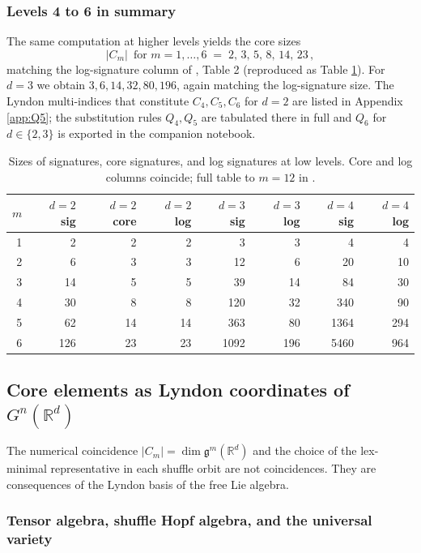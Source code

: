 \documentclass[12pt,english]{article}
\providecommand{\tabularnewline}{\\}
\theoremstyle{remark}
\begin{document}
\subsubsection{Levels 4 to 6 in summary}

The same computation at higher levels yields the core sizes
\begin{equation}
|C_{m}|\,\text{ for }m=1,\ldots,6\;=\;2,\,3,\,5,\,8,\,14,\,23\,,\label{eq:CoreSizesD2}
\end{equation}
matching the log-signature column of \cite{log signatures}, Table
2 (reproduced as Table \ref{tab:Sizes-log-sign}). For $d=3$ we obtain
$3,6,14,32,80,196$, again matching the log-signature size. The Lyndon
multi-indices that constitute $C_{4},C_{5},C_{6}$ for $d=2$ are
listed in Appendix \ref{app:Q5}; the substitution rules $Q_{4},Q_{5}$
are tabulated there in full and $Q_{6}$ for $d\in\{2,3\}$ is exported
in the companion notebook.

\begin{table}[H]
\centering
\begin{tabular}{|r|r|r|r|r|r|r|r|}
\hline
$m$ & $d=2$ sig & $d=2$ core & $d=2$ log & $d=3$ sig & $d=3$ log & $d=4$ sig & $d=4$ log\tabularnewline
\hline\hline
1 & 2 & 2 & 2 & 3 & 3 & 4 & 4\tabularnewline\hline
2 & 6 & 3 & 3 & 12 & 6 & 20 & 10\tabularnewline\hline
3 & 14 & 5 & 5 & 39 & 14 & 84 & 30\tabularnewline\hline
4 & 30 & 8 & 8 & 120 & 32 & 340 & 90\tabularnewline\hline
5 & 62 & 14 & 14 & 363 & 80 & 1364 & 294\tabularnewline\hline
6 & 126 & 23 & 23 & 1092 & 196 & 5460 & 964\tabularnewline\hline
\end{tabular}
\caption{Sizes of signatures, core signatures, and log signatures at low levels.
Core and log columns coincide; full table to $m=12$ in \cite{log signatures}.\label{tab:Sizes-log-sign}}
\end{table}

\subsection{Core elements as Lyndon coordinates of $G^{n}(\mathbb{R}^{d})$\label{subsec:Lyndon-coordinates}}

The numerical coincidence $|C_{m}|=\dim\mathfrak{g}^{m}(\mathbb{R}^{d})$
and the choice of the lex-minimal representative in each shuffle orbit
are not coincidences. They are consequences of the Lyndon basis of
the free Lie algebra.

\subsubsection{Tensor algebra, shuffle Hopf algebra, and the universal variety\label{subsubsec:Hopf-background}}
\end{document}
